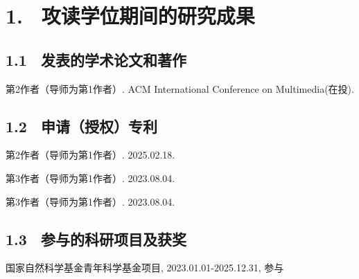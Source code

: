 \section{1. \ 攻读学位期间的研究成果}
\subsection{1.1 \ 发表的学术论文和著作}
\noindent [1]
\begin{minipage}[t]{0.96\linewidth}
第2作者（导师为第1作者）. ACM International Conference on Multimedia(在投).
\end{minipage}
\vspace{0cm}

\subsection{1.2 \ 申请（授权）专利}
\noindent [1]
\begin{minipage}[t]{0.96\linewidth}
    第2作者（导师为第1作者）. 2025.02.18.
\end{minipage}

\noindent [2]
\begin{minipage}[t]{0.96\linewidth}
    第3作者（导师为第1作者）. 2023.08.04.
\end{minipage}

\noindent [3]
\begin{minipage}[t]{0.96\linewidth}
    第3作者（导师为第1作者）. 2023.08.04.
\end{minipage}

\subsection{1.3 \ 参与的科研项目及获奖}
\noindent [1]
\begin{minipage}[t]{0.96\linewidth}
    国家自然科学基金青年科学基金项目, 2023.01.01-2025.12.31, 参与
\end{minipage}
